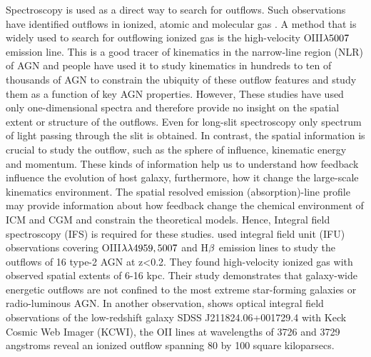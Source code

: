 

Spectroscopy is used as a direct way to search for outflows. Such observations have identified outflows in ionized, atomic and molecular gas \citep{nesvadba2008evidence}. A method that is widely used to search for outflowing ionized gas is the high-velocity OIII$\rm \lambda5007$ emission line. This is a good tracer of kinematics in the narrow-line region (NLR) of AGN and people have used it to study kinematics in hundreds to ten of thousands of AGN \citep{wang2011evolution,mullaney2013narrow} to constrain the ubiquity of these outflow features and study them as a function of key AGN properties. 
However, These studies have used only one-dimensional spectra and therefore provide no insight on the spatial extent or structure of the outflows. Even for long-slit spectroscopy only spectrum of light passing through the slit is obtained. In contrast, the spatial information is crucial to study the outflow, such as the sphere of influence, kinematic energy and momentum. These kinds of information help us to understand how feedback influence the evolution of host galaxy, furthermore, how it change the large-scale kinematics environment. The spatial resolved emission (absorption)-line profile may provide information about how feedback change the chemical environment of ICM and CGM and constrain the theoretical models. Hence, Integral field spectroscopy (IFS) is required for these studies. \citet{harrison2014kiloparsec} used integral field unit (IFU) observations covering OIII$\rm \lambda \lambda 4959,5007$ and H$\rm \beta$ emission lines to study the outflows of 16 type-2 AGN at z<0.2. They found high-velocity ionized gas with observed spatial extents of 6-16 kpc. Their study demonstrates that galaxy-wide energetic outflows are not confined to the most extreme star-forming galaxies or radio-luminous AGN. In another observation, \citet{rupke2019100} shows optical integral field observations of the low-redshift galaxy SDSS J211824.06+001729.4 with Keck Cosmic Web Imager (KCWI), the OII lines at wavelengths of 3726 and 3729 angstroms reveal an ionized outflow spanning 80 by 100 square kiloparsecs. 


